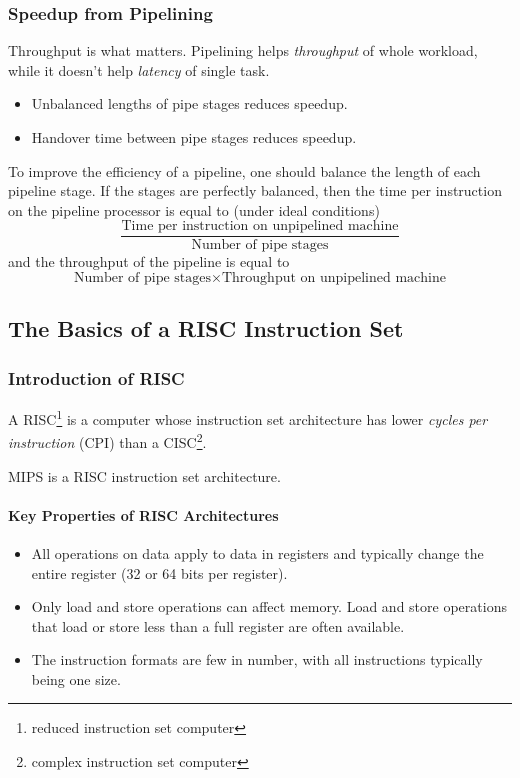 \documentclass[12pt, a4paper]{article}
\theoremstyle{margin}
\begin{document}
    \subsubsection{Speedup from Pipelining}

      \indent 

      Throughput is what matters. Pipelining helps \emph{throughput} of whole workload, while it doesn't help \emph{latency} of single task. 

      \begin{itemize}
        \item Unbalanced lengths of pipe stages reduces speedup. 
        \item Handover time between pipe stages reduces speedup.
      \end{itemize}

      To improve the efficiency of a pipeline, one should balance the length of each pipeline stage. If the stages are perfectly balanced, then the time per instruction on the pipeline processor is equal to (under ideal conditions) 
      $$\frac{\text{Time per instruction on unpipelined machine}}{\text{Number of pipe stages}}$$ 
      and the throughput of the pipeline is equal to 
      $$\text{Number of pipe stages} \times \text{Throughput on unpipelined machine}$$

  \subsection{The Basics of a RISC Instruction Set}

    \subsubsection{Introduction of RISC}

      \indent 

      A RISC\footnote{reduced instruction set computer} is a computer whose instruction set architecture has lower \emph{cycles per instruction} (CPI) than a CISC\footnote{complex instruction set computer}.

      MIPS is a RISC instruction set architecture.

      \paragraph{Key Properties of RISC Architectures\cite{caqa}}
        \begin{itemize}
          \item All operations on data apply to data in registers and typically change the entire register (32 or 64 bits per register).
          \item Only load and store operations can affect memory. Load and store operations that load or store less than a full register are often available.
          \item The instruction formats are few in number, with all instructions typically being one size.
        \end{itemize}
\end{document}
